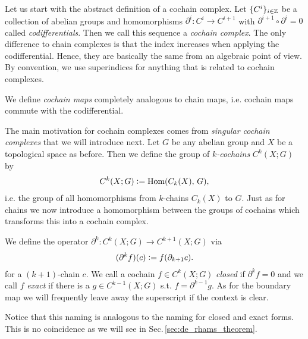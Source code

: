 \documentclass[../master_thesis.tex]{subfiles}
\begin{document}
Let us start with the abstract definition of a cochain complex.
Let $\{ C^i \}_{i\in \mathbb{Z}}$ be a collection of abelian groups
and homomorphisms $\partial^i: C^i \rightarrow C^{i+1}$ with 
$\partial^{i+1} \circ \partial^i = 0$ called \textit{codifferentials}. 
Then we call this sequence a 
\textit{cochain complex}. The only difference to chain complexes
is that the index 
increases when applying the codifferential. Hence, they are 
basically the same from an algebraic point of view.
By convention, 
we use superindices for anything that is related to cochain complexes. 

We define \textit{cochain maps} completely analogous to chain maps,
i.e. cochain maps commute with the codifferential.

The main motivation for cochain complexes comes from 
\textit{singular cochain complexes} that we will introduce next.
Let $G$ be any abelian group and $X$ be a topological space as before. 
Then we define the group 
of \textit{$k$-cochains} $C^k(X;G)$ by
\begin{align*}
    C^k(X;G) \vcentcolon= \text{Hom}(C_k(X),\,G),
\end{align*}
i.e. the group of all homomorphisms from $k$-chains $C_k(X)$ to $G$. 
Just as for chains we now introduce a homomorphism between the groups of cochains
which transforms this into a cochain complex.
\begin{definition}[Coboundary ]
    We define the operator $\partial^k: C^k(X;G) \rightarrow C^{k+1}(X;G)$ via
    \begin{align*}
        (\partial^k f) (c) \vcentcolon= f(\partial_{k+1} c).
    \end{align*}
    for a $(k+1)$-chain $c$.
    We call a cochain $f \in C^k(X;G)$ \textit{closed} if $\partial^k f = 0$ 
    and we call $f$
    \textit{exact} if there is a $g \in C^{k-1}(X;G)$ s.t. $f = \partial^{k-1} g$.
    As for the boundary map we will frequently leave away the superscript if
    the context is clear.
\end{definition}
Notice that this naming is analogous to the naming for closed and exact forms. 
This is no coincidence as we will see in Sec.\,\ref{sec:de_rhams_theorem}.
\end{document}
